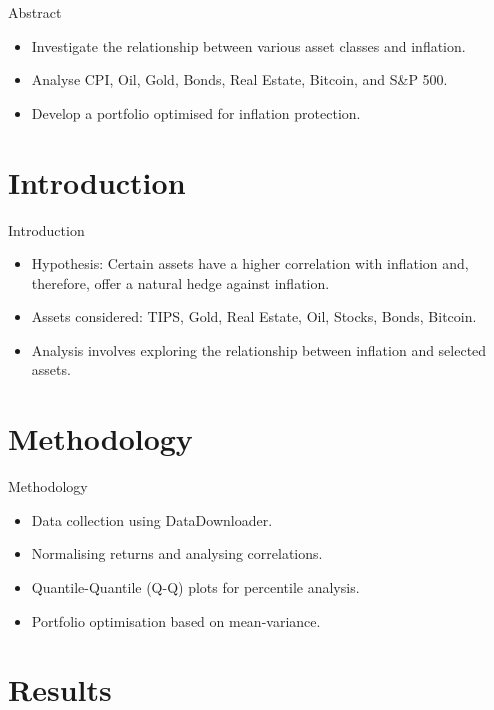 \documentclass{beamer}
\begin{document}
\begin{frame}{Abstract}
  \begin{itemize}
    \item Investigate the relationship between various asset classes and inflation.
    \item Analyse CPI, Oil, Gold, Bonds, Real Estate, Bitcoin, and S\&P 500.
    \item Develop a portfolio optimised for inflation protection.
  \end{itemize}
\end{frame}

\section{Introduction}

\begin{frame}{Introduction}
  \begin{itemize}
    \item Hypothesis: Certain assets have a higher correlation with inflation and, therefore, offer a natural hedge against inflation.
    \item Assets considered: TIPS, Gold, Real Estate, Oil, Stocks, Bonds, Bitcoin.
    \item Analysis involves exploring the relationship between inflation and selected assets.
  \end{itemize}
\end{frame}

\section{Methodology}

\begin{frame}{Methodology}
  \begin{itemize}
    \item Data collection using DataDownloader.
    \item Normalising returns and analysing correlations.
    \item Quantile-Quantile (Q-Q) plots for percentile analysis.
    \item Portfolio optimisation based on mean-variance.
  \end{itemize}
\end{frame}

\section{Results}
\end{document}
